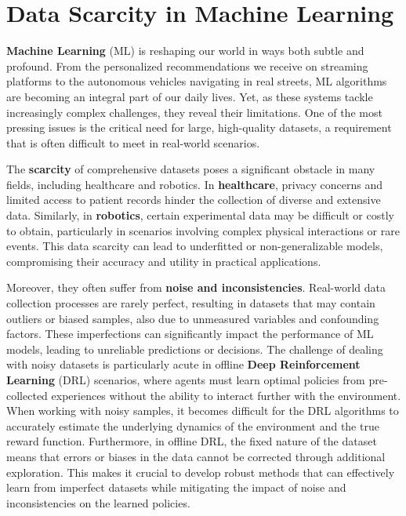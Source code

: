 \section{Data Scarcity in Machine Learning}

\textbf{Machine Learning} (ML) is reshaping our world in ways both
subtle and profound. From the personalized recommendations we receive
on streaming platforms to the autonomous vehicles navigating in real streets,
ML algorithms are becoming an integral part of our daily lives.
Yet, as these systems tackle increasingly complex challenges,
they reveal their limitations.
One of the most pressing issues is the critical need for large, 
high-quality datasets, a requirement that is often difficult to
meet in real-world scenarios.

The \textbf{scarcity} of comprehensive datasets poses a significant
obstacle in many fields, including healthcare and robotics.
In \textbf{healthcare}, privacy concerns and limited access to patient
records hinder the collection of diverse and extensive data.
Similarly, in \textbf{robotics}, certain experimental data may be difficult
or costly to obtain, particularly in scenarios involving complex
physical interactions or rare events. This data scarcity can lead
to underfitted or non-generalizable models, compromising their
accuracy and utility in practical applications.

Moreover, they
often suffer from \textbf{noise and inconsistencies}. Real-world data
collection processes are rarely perfect, resulting in datasets
that may contain outliers or biased samples, also due to unmeasured
variables and confounding factors.
These imperfections can significantly impact the performance of ML models,
leading to unreliable predictions or decisions. The challenge of dealing
with noisy datasets is particularly acute in offline
\textbf{Deep Reinforcement Learning} (DRL) scenarios, where agents must learn
optimal policies from pre-collected experiences without the ability
to interact further with the environment.
When working with noisy samples, it becomes difficult for the DRL algorithms to accurately estimate the underlying dynamics of the environment and the true reward function.
Furthermore, in offline DRL, the fixed nature of the dataset means that errors or biases in the data cannot be corrected through additional exploration. This makes it crucial to develop robust methods that can effectively learn from imperfect datasets while mitigating the impact of noise and inconsistencies on the learned policies.

